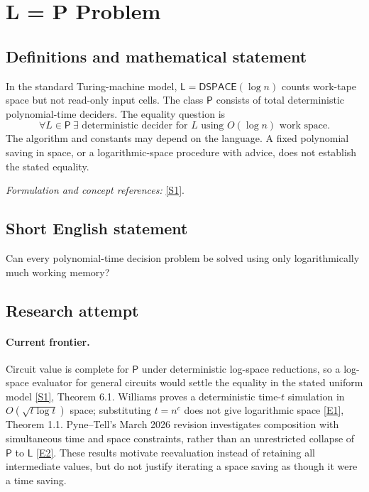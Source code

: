 \documentclass[11pt,a4paper]{article}
\newcommand{\sref}[2]{\hyperlink{source:#1:#2}{[S#2]}}
\newcommand{\eref}[2]{\hyperlink{extra:#1:#2}{[E#2]}}
\newif\ifshowcatalogue
\newcommand{\cataloguescope}[1]{\ifshowcatalogue
 \paragraph{Exact scope in the supplied catalogue.}
 \begin{quote}\small #1\end{quote}\fi}
\numberwithin{equation}{section}
\begin{document}
\setcounter{section}{59}
\clearpage
\section{\texorpdfstring{L = P Problem}{L = P Problem}}\label{60}
\subsection{Definitions and mathematical statement}
In the standard Turing-machine model, $\mathsf L=\mathsf{DSPACE}(\log n)$ counts work-tape space but not read-only input cells. The class $\mathsf P$ consists of total deterministic polynomial-time deciders. The equality question is
\[
 \forall L\in\mathsf P\ \exists\text{ deterministic decider for }L
 \text{ using }O(\log n)\text{ work space}.
\]
The algorithm and constants may depend on the language. A fixed polynomial saving in space, or a logarithmic-space procedure with advice, does not establish the stated equality.
\par\smallskip\textit{Formulation and concept references:} \sref{60}{1}.
\cataloguescope{Prove or disprove that every language decidable by a deterministic polynomial-time Turing machine is decidable using O(log n) work space; equivalently, determine whether the complexity classes L and P are equal.}
\subsection{Short English statement}
Can every polynomial-time decision problem be solved using only logarithmically much working memory?
\subsection{Research attempt}

\paragraph{Current frontier.}
Circuit value is complete for $\mathsf P$ under deterministic log-space reductions, so a log-space evaluator for general circuits would settle the equality in the stated uniform model \sref{60}{1}, Theorem 6.1. Williams proves a deterministic time-$t$ simulation in $O(\sqrt{t\log t})$ space; substituting $t=n^c$ does not give logarithmic space \eref{60}{1}, Theorem 1.1. Pyne--Tell's March 2026 revision investigates composition with simultaneous time and space constraints, rather than an unrestricted collapse of $\mathsf P$ to $\mathsf L$ \eref{60}{2}. These results motivate reevaluation instead of retaining all intermediate values, but do not justify iterating a space saving as though it were a time saving.
\end{document}
